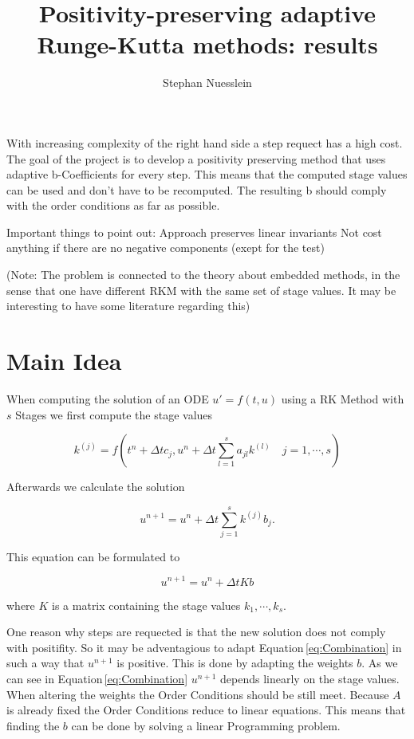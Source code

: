 \documentclass{article}
\title{Positivity-preserving adaptive Runge-Kutta methods: results}
\author{Stephan Nuesslein}
\begin{document}
\maketitle

With increasing complexity of the right hand side a step requect has a high cost. 
The goal of the project is to develop a positivity preserving method that uses adaptive b-Coefficients for every step.  This means that the computed stage values can be used and don't have to be recomputed. 
The resulting b should comply with the order conditions as far as possible.

Important things to point out:
Approach preserves linear invariants
Not cost anything if there are no negative components (exept for the test)

(Note: The problem is connected to the theory about embedded methods, in the sense that one have different RKM with the same set of stage values. It may be interesting to have some literature regarding this)

\section{Main Idea}

When computing the solution of an ODE $u ' = f(t,u) $ using a RK Method with $s$ Stages we first compute the stage values 

\begin{equation}
k^{(j)} =  f(t^n + \Delta t c_j, u^n + \Delta t \sum_{l = 1}^{s} a_{jl} k^{(l)}  \quad j = 1,\cdots,s)
\end{equation}

Afterwards we calculate the solution 

\begin{equation}
u^{n+1} = u^n + \Delta t \sum_{j  = 1}^s k^{(j)} b_j .
\end{equation}

This equation can be formulated to

\begin{equation}\label{eq:Combination}
u^{n+1} = u^n + \Delta t K b
\end{equation}

where $K$ is a matrix containing the stage values $k_1,\cdots,k_s$.

One reason why steps are requected is that the new solution does not comply with positifity. 
So it may be adventagious to adapt Equation\,\ref{eq:Combination} in such a way that $u^{n+1}$ is positive. This is done by adapting the weights $b$.
As we can see in Equation\,\ref{eq:Combination} $u^{n+1}$ depends linearly on the stage values.
When altering the weights the Order Conditions should be still meet. 
Because $A$ is already fixed the Order Conditions reduce to linear equations.
This means that finding the $b$ can be done by solving a linear Programming problem.
 
\end{document}

